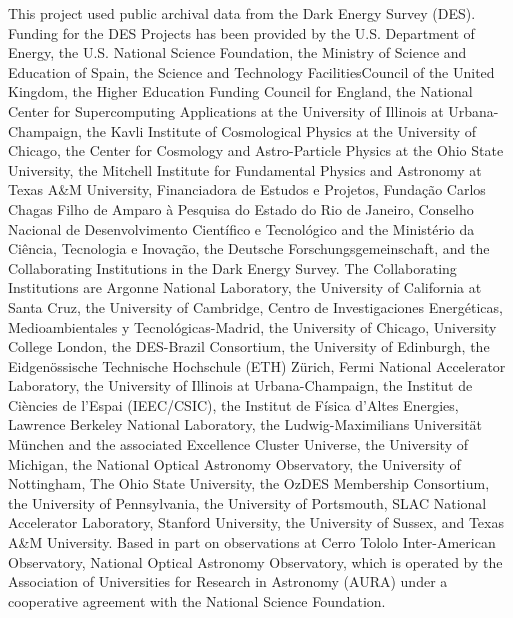\documentclass[twocolumn]{aastex63}
\begin{document}
This project used public archival data from the Dark Energy Survey (DES). Funding for the DES Projects has been provided by the U.S. Department of Energy, the U.S. National Science Foundation, the Ministry of Science and Education of Spain, the Science and Technology FacilitiesCouncil of the United Kingdom, the Higher Education Funding Council for England, the National Center for Supercomputing Applications at the University of Illinois at Urbana-Champaign, the Kavli Institute of Cosmological Physics at the University of Chicago, the Center for Cosmology and Astro-Particle Physics at the Ohio State University, the Mitchell Institute for Fundamental Physics and Astronomy at Texas A\&M University, Financiadora de Estudos e Projetos, Funda{\c c}{\~a}o Carlos Chagas Filho de Amparo {\`a} Pesquisa do Estado do Rio de Janeiro, Conselho Nacional de Desenvolvimento Cient{\'i}fico e Tecnol{\'o}gico and the Minist{\'e}rio da Ci{\^e}ncia, Tecnologia e Inova{\c c}{\~a}o, the Deutsche Forschungsgemeinschaft, and the Collaborating Institutions in the Dark Energy Survey.
The Collaborating Institutions are Argonne National Laboratory, the University of California at Santa Cruz, the University of Cambridge, Centro de Investigaciones Energ{\'e}ticas, Medioambientales y Tecnol{\'o}gicas-Madrid, the University of Chicago, University College London, the DES-Brazil Consortium, the University of Edinburgh, the Eidgen{\"o}ssische Technische Hochschule (ETH) Z{\"u}rich,  Fermi National Accelerator Laboratory, the University of Illinois at Urbana-Champaign, the Institut de Ci{\`e}ncies de l'Espai (IEEC/CSIC), the Institut de F{\'i}sica d'Altes Energies, Lawrence Berkeley National Laboratory, the Ludwig-Maximilians Universit{\"a}t M{\"u}nchen and the associated Excellence Cluster Universe, the University of Michigan, the National Optical Astronomy Observatory, the University of Nottingham, The Ohio State University, the OzDES Membership Consortium, the University of Pennsylvania, the University of Portsmouth, SLAC National Accelerator Laboratory, Stanford University, the University of Sussex, and Texas A\&M University.
Based in part on observations at Cerro Tololo Inter-American Observatory, National Optical Astronomy Observatory, which is operated by the Association of Universities for Research in Astronomy (AURA) under a cooperative agreement with the National Science Foundation.
\end{document}
